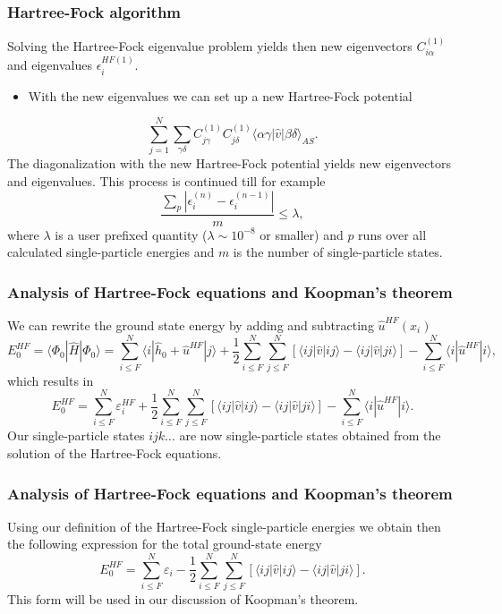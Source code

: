 \documentclass{beamer}
\begin{document}
\begin{frame}
\frametitle{Hartree-Fock algorithm}

\begin{block}{}
Solving the Hartree-Fock eigenvalue problem yields then new eigenvectors $C_{i\alpha}^{(1)}$ and eigenvalues
$\epsilon_i^{HF(1)}$. 
\begin{itemize}
 \item With the new eigenvalues we can set up a new Hartree-Fock potential 
\end{itemize}

\noindent
\[
\sum_{j = 1}^N\sum_{\gamma\delta} C_{j\gamma}^{(1)}C_{j\delta}^{(1)}\langle \alpha\gamma|\hat{v}|\beta\delta\rangle_{AS}.
\]
The diagonalization with the new Hartree-Fock potential yields new eigenvectors and eigenvalues.
This process is continued till for example
\[
\frac{\sum_{p} |\epsilon_i^{(n)}-\epsilon_i^{(n-1)}|}{m} \le \lambda,  
\]
where $\lambda$ is a user prefixed quantity ($\lambda \sim 10^{-8}$ or smaller) and $p$ runs over all calculated single-particle
energies and $m$ is the number of single-particle states.
\end{block}
\end{frame}

\begin{frame}
\frametitle{Analysis of Hartree-Fock equations and Koopman's theorem}

\begin{block}{}
We can rewrite the ground state energy by adding and subtracting $\hat{u}^{HF}(x_i)$ 
\[
  E_0^{HF} =\langle \Phi_0 | \hat{H} | \Phi_0\rangle = 
\sum_{i\le F}^N \langle i | \hat{h}_0 +\hat{u}^{HF}| j\rangle+ \frac{1}{2}\sum_{i\le F}^N\sum_{j \le F}^N\left[\langle ij |\hat{v}|ij \rangle-\langle ij|\hat{v}|ji\rangle\right]-\sum_{i\le F}^N \langle i |\hat{u}^{HF}| i\rangle,
\]
which results in
\[
  E_0^{HF}
  = \sum_{i\le F}^N \varepsilon_i^{HF} + \frac{1}{2}\sum_{i\le F}^N\sum_{j \le F}^N\left[\langle ij |\hat{v}|ij \rangle-\langle ij|\hat{v}|ji\rangle\right]-\sum_{i\le F}^N \langle i |\hat{u}^{HF}| i\rangle.
\]
Our single-particle states $ijk\dots$ are now single-particle states obtained from the solution of the Hartree-Fock equations.
\end{block}
\end{frame}

\begin{frame}
\frametitle{Analysis of Hartree-Fock equations and Koopman's theorem}

\begin{block}{}
Using our definition of the Hartree-Fock single-particle energies we obtain then the following expression for the total ground-state energy
\[
  E_0^{HF}
  = \sum_{i\le F}^N \varepsilon_i - \frac{1}{2}\sum_{i\le F}^N\sum_{j \le F}^N\left[\langle ij |\hat{v}|ij \rangle-\langle ij|\hat{v}|ji\rangle\right].
\]
This form will be used in our discussion of Koopman's theorem.
\end{block}
\end{frame}
\end{document}

